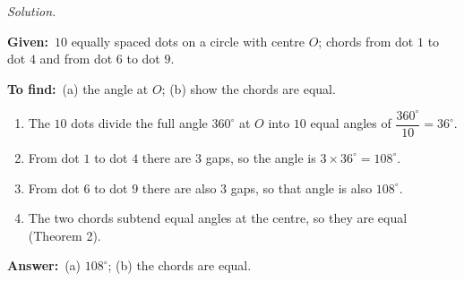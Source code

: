 \documentclass[11pt,a4paper]{article}
\newenvironment{answerblock}
  {\par\needspace{6\baselineskip}\smallskip\begingroup\small\linespread{1.2}\selectfont\color{muted}\noindent\textit{Solution.}\par}
  {\par\endgroup\medskip}
\newcommand{\Given}{\textbf{Given:}~}
\newcommand{\Tofind}{\textbf{To find:}~}
\newcommand{\Ans}{\textbf{Answer:}~}
\begin{document}
\begin{answerblock}
\begin{minipage}[t]{0.66\linewidth}\vspace{0pt}
\Given $10$ equally spaced dots on a circle with centre $O$; chords from dot $1$ to dot $4$ and from dot $6$ to dot $9$.

\Tofind (a) the angle at $O$; (b) show the chords are equal.

\begin{enumerate}[label=\arabic*.,leftmargin=1.6em,itemsep=0pt,topsep=2pt]
\item The $10$ dots divide the full angle $360^\circ$ at $O$ into $10$ equal angles of $\dfrac{360^\circ}{10}=36^\circ$.
\item From dot $1$ to dot $4$ there are $3$ gaps, so the angle is $3\times36^\circ=108^\circ$.
\item From dot $6$ to dot $9$ there are also $3$ gaps, so that angle is also $108^\circ$.
\item The two chords subtend equal angles at the centre, so they are equal (Theorem 2).
\end{enumerate}
\Ans (a) $108^\circ$; (b) the chords are equal.
\end{minipage}\hfill
\begin{minipage}[t]{0.3\linewidth}\vspace{0pt}
\centering
{}
\end{minipage}
\end{answerblock}
\end{document}
